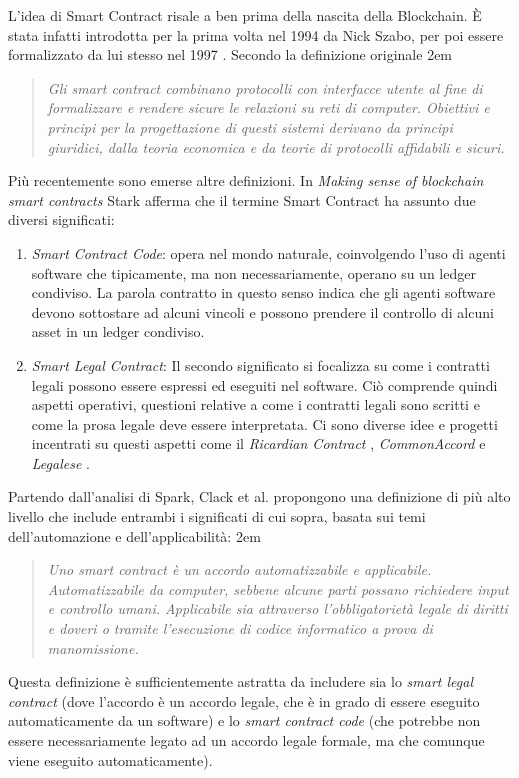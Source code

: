 L'idea di Smart Contract risale a ben prima della nascita della Blockchain. È stata infatti introdotta
per la prima volta nel 1994 da Nick Szabo, per poi
essere formalizzato da lui stesso nel 1997 \cite{szabo-smart-contracts}.
Secondo la definizione originale
\begingroup
\advance\leftmargini 2em
\begin{quote}
	{
		{\em Gli smart contract combinano protocolli con interfacce utente
				al fine di formalizzare e rendere sicure
				le relazioni su reti di computer.
				Obiettivi e principi per la progettazione di questi sistemi
				derivano da principi giuridici, dalla teoria economica
				e da teorie di protocolli affidabili e sicuri.}
	}
\end{quote}
\endgroup

Più recentemente sono emerse altre definizioni.
In \textit{Making sense of blockchain smart contracts} \cite{making-sense-of-bsc}
Stark afferma che il termine Smart Contract ha assunto due diversi significati:
\begin{enumerate}
	\item \textit{Smart Contract Code}: opera nel mondo naturale,
	      coinvolgendo l'uso di agenti software che tipicamente,
	      ma non necessariamente, operano su un ledger condiviso. La parola contratto in questo senso
	      indica che gli agenti software devono sottostare ad alcuni vincoli e possono prendere il controllo
	      di alcuni asset in un ledger condiviso.
	\item \textit{Smart Legal Contract}:
	      Il secondo significato si focalizza su come i contratti legali possono essere espressi ed eseguiti nel software.
	      Ciò comprende quindi aspetti operativi, questioni relative a come i contratti legali
	      sono scritti e come la prosa legale deve essere interpretata. Ci sono diverse idee e
	      progetti incentrati su questi aspetti come il \textit{Ricardian Contract} \cite{ricardian-contract},
	      \textit{CommonAccord} \cite{commonaccord} e \textit{Legalese} \cite{legalese}.
\end{enumerate}
Partendo dall'analisi di Spark, Clack et al. \cite{Clack2016SmartCT} propongono una definizione
di più alto livello che include entrambi i significati di cui sopra, basata sui temi
dell'automazione e dell'applicabilità:
\begingroup
\advance\leftmargini 2em
\begin{quote}
	{
		{\em Uno smart contract è un accordo automatizzabile e applicabile. Automatizzabile da computer,
				sebbene alcune parti possano richiedere input e controllo umani. Applicabile sia attraverso
				l'obbligatorietà legale di diritti e doveri o tramite
				l'esecuzione di codice informatico a prova di manomissione.}
	}
\end{quote}
\endgroup
Questa definizione è sufficientemente astratta da includere sia lo \textit{smart legal contract}
(dove l'accordo è un accordo legale, che è in grado di essere eseguito automaticamente da un software)
e lo \textit{smart contract code} (che potrebbe non essere necessariamente legato ad un accordo legale formale,
ma che comunque viene eseguito automaticamente).



